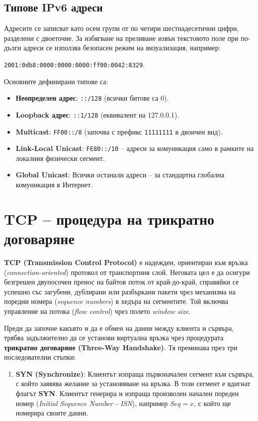 \documentclass{scrartcl}
\begin{document}
\begin{FlushLeft}
\subsection{Типове IPv6 адреси}
Адресите се записват като осем групи от по четири шестнадесетични цифри, разделени с двоеточие. За избягване на преливане извън текстовото поле при по-дълги адреси се използва безопасен режим на визуализация, например:

\verb|2001:0db8:0000:0000:0000:ff00:0042:8329|.

Основните дефинирани типове са:
\begin{itemize}
    \item \textbf{Неопределен адрес}: \verb|::/128| (всички битове са 0).
    \item \textbf{Loopback адрес}: \verb|::1/128| (еквивалент на 127.0.0.1).
    \item \textbf{Multicast}: \verb|FF00::/8| (започва с префикс \texttt{11111111} в двоичен вид).
    \item \textbf{Link-Local Unicast}: \verb|FE80::/10| – адреси за комуникация само в рамките на локалния физически сегмент.
    \item \textbf{Global Unicast}: Всички останали адреси – за стандартна глобална комуникация в Интернет.
\end{itemize}


\section{TCP – процедура на трикратно договаряне}

\textbf{TCP (Transmission Control Protocol)} е надежден, ориентиран към връзка (\textit{connection-oriented}) протокол от транспортния слой. Неговата цел е да осигури безгрешен двупосочен пренос на байтов поток от край-до-край, справяйки се успешно със загубени, дублирани или разбъркани пакети чрез механизма на поредни номера (\textit{sequence numbers}) в хедъра на сегментите. Той включва управление на потока (\textit{flow control}) чрез полето \textit{window size}.

Преди да започне какъвто и да е обмен на данни между клиента и сървъра, трябва задължително да се установи виртуална връзка чрез процедурата \textbf{трикратно договаряне (Three-Way Handshake)}. Тя преминава през три последователни стъпки:

\begin{enumerate}
    \item \textbf{SYN (Synchronize)}: Клиентът изпраща първоначален сегмент към сървъра, с който заявява желание за установяване на връзка. В този сегмент е вдигнат флагът \textbf{SYN}. Клиентът генерира и изпраща произволен начален пореден номер (\textit{Initial Sequence Number - ISN}), например $Seq = x$, с който ще номерира своите данни.
    

\end{enumerate}
\end{FlushLeft}
\end{document}
